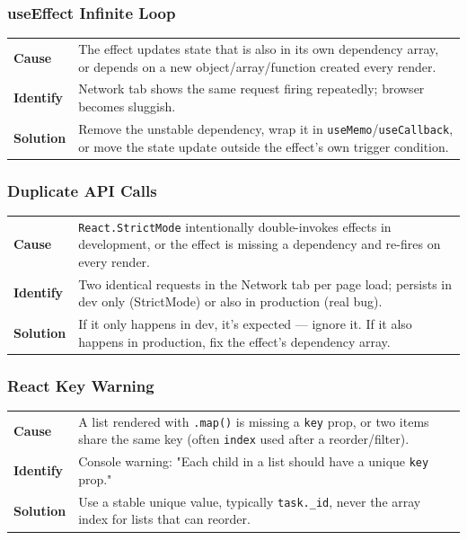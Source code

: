 \subsubsection*{useEffect Infinite Loop}
\noindent\begin{tabularx}{\textwidth}{@{}>{\bfseries}p{2.3cm}X@{}}
\toprule
Cause & The effect updates state that is also in its own dependency array,
or depends on a new object/array/function created every render. \\
Identify & Network tab shows the same request firing repeatedly;
browser becomes sluggish. \\
Solution & Remove the unstable dependency, wrap it in
\texttt{useMemo}/\texttt{useCallback}, or move the state update outside
the effect's own trigger condition. \\
\bottomrule
\end{tabularx}

\subsubsection*{Duplicate API Calls}
\noindent\begin{tabularx}{\textwidth}{@{}>{\bfseries}p{2.3cm}X@{}}
\toprule
Cause & \texttt{React.StrictMode} intentionally double-invokes effects in
development, or the effect is missing a dependency and re-fires on every
render. \\
Identify & Two identical requests in the Network tab per page load;
persists in dev only (StrictMode) or also in production (real bug). \\
Solution & If it only happens in dev, it's expected --- ignore it. If it
also happens in production, fix the effect's dependency array. \\
\bottomrule
\end{tabularx}

\subsubsection*{React Key Warning}
\noindent\begin{tabularx}{\textwidth}{@{}>{\bfseries}p{2.3cm}X@{}}
\toprule
Cause & A list rendered with \texttt{.map()} is missing a \texttt{key}
prop, or two items share the same key (often \texttt{index} used after a
reorder/filter). \\
Identify & Console warning: "Each child in a list should have a unique
\texttt{key} prop." \\
Solution & Use a stable unique value, typically \texttt{task.\_id}, never
the array index for lists that can reorder. \\
\bottomrule
\end{tabularx}

